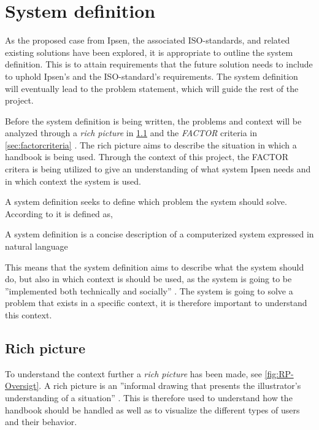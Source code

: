 \section{System definition}\label{sec:SystemDefinition}
As the proposed case from Ipsen, the associated ISO-standards, and related existing solutions have been explored, it is appropriate to outline the system definition.
This is to attain requirements that the future solution needs to include to uphold Ipsen's and the ISO-standard's requirements.
The system definition will eventually lead to the problem statement, which will guide the rest of the project.

Before the system definition is being written, the problems and context will be analyzed through a \textit{rich picture} in \cref{sec:richpictures} and the \textit{FACTOR} criteria in \cref{sec:factorcriteria} \citep{Rod-Aalborg}.
The rich picture aims to describe the situation in which a handbook is being used.
Through the context of this project, the FACTOR critera is being utilized to give an understanding of what system Ipsen needs and in which context the system is used.

A system definition seeks to define which problem the system should solve.
According to  \citep[p.~24]{Rod-Aalborg} it is defined as,

\begin{defn}
	A system definition is a concise description of a computerized system expressed in natural language
\end{defn}

This means that the system definition aims to describe what the system should do, but also in which context is should be used, as the system is going to be ''implemented both technically and socially'' \citep[p.~23]{Rod-Aalborg}.
The system is going to solve a problem that exists in a specific context, it is therefore important to understand this context.

\subsection{Rich picture} \label{sec:richpictures}

To understand the context further a \textit{rich picture} has been made, see \cref{fig:RP-Oversigt}. A rich picture is an ''informal drawing that presents the illustrator's understanding of a situation'' \citep[~p. 26]{Rod-Aalborg}.
This is therefore used to understand how the handbook should be handled as well as to visualize the different types of users and their behavior.

